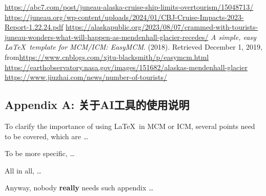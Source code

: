 \documentclass[12pt]{article}  %
\begin{document}

\begin{thebibliography}{99}
 \url{https://abc7.com/post/juneau-alaska-cruise-ship-limits-overtourism/15048713/}
 \url{https://juneau.org/wp-content/uploads/2024/01/CBJ-Cruise-Impacts-2023-Report-1.22.24.pdf}
 \url{https://alaskapublic.org/2023/08/07/crammed-with-tourists-juneau-wonders-what-will-happen-as-mendenhall-glacier-recedes/}
 \emph{A simple, easy \LaTeX\ template for MCM/ICM: EasyMCM}. (2018). Retrieved December 1, 2019, from\url{https://www.cnblogs.com/xjtu-blacksmith/p/easymcm.html}
 \url{https://earthobservatory.nasa.gov/images/151682/alaskas-mendenhall-glacier}
 \url{https://www.jiuzhai.com/news/number-of-tourists/}
\end{thebibliography}


\begin{subappendices}  %

\section{Appendix A: 关于AI工具的使用说明}
To clarify the importance of using \LaTeX\ in MCM or ICM, several points need to be covered, which are \ldots

To be more specific, \ldots

All in all, \ldots

Anyway, nobody \textbf{really} needs such appendix \ldots

\end{subappendices}  %
\end{document}

